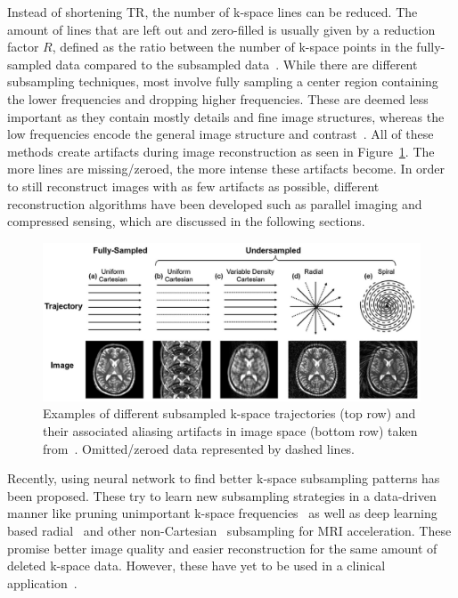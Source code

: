 Instead of shortening TR, the number of k-space lines can be reduced. The amount of lines that are left out and zero-filled is usually given by a reduction factor $R$, defined as the ratio between the number of k-space points in the fully-sampled data compared to the subsampled data~\cite{AdvancesPI,ParallelMRI}. While there are different subsampling techniques, most involve fully sampling a center region containing the lower frequencies and dropping higher frequencies. These are deemed less important as they contain mostly details and fine image structures, whereas the low frequencies encode the general image structure and contrast~\cite{SamplingStrategies}. All of these methods create artifacts during image reconstruction as seen in Figure~\ref{fig:ExamplesSubsampling}. The more lines are missing/zeroed, the more intense these artifacts become. In order to still reconstruct images with as few artifacts as possible, different reconstruction algorithms have been developed such as parallel imaging and compressed sensing, which are discussed in the following sections.

\begin{figure}[h] %
	\centering
	\graphicspath{{images/}{\main/images/}}
	\includegraphics[width=\linewidth]{ExamplesSubsampling.png} 
	\caption{Examples of different subsampled k-space trajectories (top row) and their associated aliasing artifacts in image space (bottom row) taken from~\cite{AdvancesPI}. Omitted/zeroed data represented by dashed lines.}
	\label{fig:ExamplesSubsampling}
\end{figure}

\noindent Recently, using neural network to find better k-space subsampling patterns has been proposed. These try to learn new subsampling strategies in a data-driven manner like pruning unimportant k-space frequencies~\cite{MRISubsamplingPruning} as well as deep learning based radial~\cite{DeepMRIReconstructionRadialSubsampling} and other non-Cartesian~\cite{DeepMRIReconstructionSubsampling} subsampling for MRI acceleration. These promise better image quality and easier reconstruction for the same amount of deleted k-space data. However, these have yet to be used in a clinical application~\cite{MRISubsamplingPruning}.


